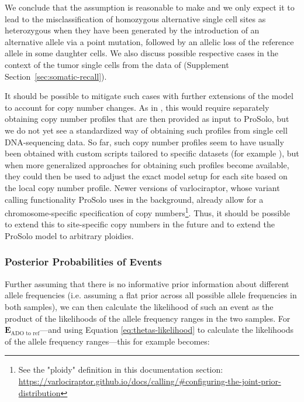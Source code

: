 \documentclass[authoryear,preprint,11pt]{scrartcl}
\begin{document}
We conclude that the assumption is reasonable to make and we only expect it to lead to the misclassification of homozygous alternative single cell sites as heterozygous when they have been generated by the introduction of an alternative allele via a point mutation, followed by an allelic loss of the reference allele in some daughter cells.
We also discuss possible respective cases in the context of the tumor single cells from the data of \citet{wang_clonal_2014} (Supplement Section~\ref{sec:somatic-recall}).

It should be possible to mitigate such cases with further extensions of the model to account for copy number changes.
As in \citet{satas_scarlet_2020}, this would require separately obtaining copy number profiles that are then provided as input to ProSolo, but we do not yet see a standardized way of obtaining such profiles from single cell DNA-sequencing data.
So far, such copy number profiles seem to have usually been obtained with custom scripts tailored to specific datasets (for example \cite{baslan_genome-wide_2012,satas_scarlet_2020,kuipers_single-cell_2020}), but when more generalized approaches for obtaining such profiles become available, they could then be used to adjust the exact model setup for each site based on the local copy number profile.
Newer versions of varlociraptor, whose variant calling functionality ProSolo uses in the background, already allow for a chromosome-specific specification of copy numbers\footnote{See the "ploidy" definition in this documentation section: \url{https://varlociraptor.github.io/docs/calling/\#configuring-the-joint-prior-distribution}}.
Thus, it should be possible to extend this to site-specific copy numbers in the future and to extend the ProSolo model to arbitrary ploidies.


\subsubsection{Posterior Probabilities of Events}\label{sec:event-posteriors}

Further assuming that there is no informative prior information about different allele frequencies (i.e. assuming a flat prior across all possible allele frequencies in both samples), we can then calculate the likelihood of such an event as the product of the likelihoods of the allele frequency ranges in the two samples.
For $\boldsymbol{E}_{\text{ADO to ref}}$---and using Equation \ref{eq:thetas-likelihood} to calculate the likelihoods of the allele frequency ranges---this for example becomes:
\end{document}
